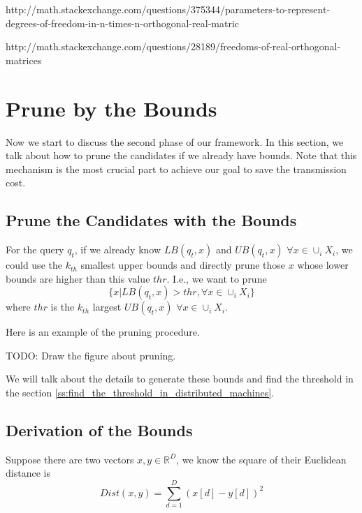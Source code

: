 http://math.stackexchange.com/questions/375344/parameters-to-represent-degrees-of-freedom-in-n-times-n-orthogonal-real-matric

http://math.stackexchange.com/questions/28189/freedoms-of-real-orthogonal-matrices

\label{ss:reduce_the_cost_of_sending_matrices}




\section{Prune by the Bounds}
\label{s:prune}
Now we start to discuss the second phase of our framework.  In this section, we talk about how to prune the candidates if we already have bounds.  Note that this mechanism is the most crucial part to achieve our goal to save the transmission cost.


\subsection{Prune the Candidates with the Bounds} %
\label{ss:prune_the_candidates_with_the_bounds}

For the query $q_t$, if we already know $LB(q_t,x)$ and $UB(q_t,x)$ $\forall x\in \cup_i X_i$, we could use the $k_{th}$ smallest upper bounds and directly prune those $x$ whose lower bounds are higher than this value $thr$. I.e., we want to prune
\[
\{x |LB(q_t,x)>thr, \forall x \in \cup_i X_i\}
\]
where $thr$ is the $k_{th}$ largest $UB(q_t,x)$ $\forall x\in \cup_i X_i$.

Here is an example of the pruning procedure.

TODO: Draw the figure about pruning.

We will talk about the details to generate these bounds and find the threshold in the section \ref{ss:find_the_threshold_in_distributed_machines}.


\subsection{Derivation of the Bounds} %
\label{ss:derivation_of_the_bounds}

Suppose there are two vectors $x,y\in \mathbb{R}^D$, we know the square of their Euclidean distance is 
\begin{equation}
	Dist(x,y)=\sum^D_{d=1}{(x[d]-y[d])^2}
\end{equation}

